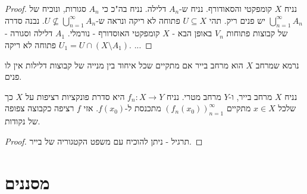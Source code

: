 \documentclass{tstextbook}
\begin{document}
\begin{proof}
נניח \(X\) קומפקטי והסאודורף. נניח ש-\(A_{n}\) דלילה. נניח בה"כ כי \(A_{n}\) סגורות, ונוכיח של \(\bigcup_{n=1}^{\infty}A_{n}\) יש פנים ריק.
תהי \(U\subseteq X\) פתוחה לא ריקה ונראה ש-\(U\not\subseteq \bigcup_{n=1}^{\infty}A_{n}\). נבנה סדרה של קבוצות פתוחות \(V_{n}\) באופן הבא - \(X\) קומפקטי האוסדורף - נורמלי. \(A_{1}\) דלילה וסגורה - \(U_{1}=U\cap (X \setminus A_{1})\) פתוחה לא ריקה. 
...

\end{proof}
\begin{definition}
נרמא שמרחב \(X\) הוא מרחב בייר אם מתקיים שכל איחוד בין מנייה של קבוצות דלילות אין לו פנים.

\end{definition}
\begin{proposition}
נניח \(X\) מרחב בייר, ו-\(Y\) מרחב מטרי. נניח \(f_{n}:X\to Y\) היא סדרת פונקציות רציפות על \(X\) כך שלכל \(x \in X\) מתקיים \((f_{n}(x_{0}))_{n=1}^{\infty}\) מתכנסת ל-\(f(x_{0})\). אזי \(f\) רציפה כקבוצה צפופה של נקודות.

\end{proposition}
\begin{proof}
תרגיל - ניתן להוכיח עם משפט הקטגוריה של בייר.

\end{proof}
\section{מסננים}
\end{document}
